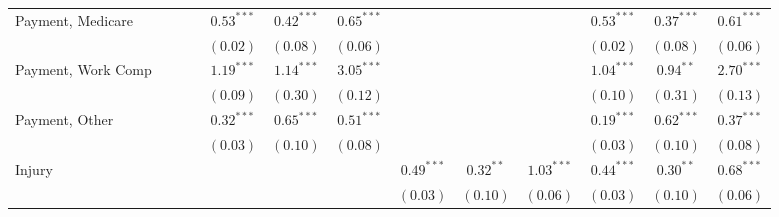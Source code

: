 \documentclass[12pt,twoside]{reedthesis}
\begin{document}
\begin{table}
\begin{center}
\begin{tiny}
\begin{tabular}{l@{} c@{} c@{} c@{} c@{} c@{} c@{} c@{} c@{} c@{} c@{} c@{} c@{} }
  Payment, Medicare  &                       &                        &                        & $\mathbf{0.53}^{***}$  & $\mathbf{0.42}^{***}$  & $\mathbf{0.65}^{***}$  &                        &                        &                        & $\mathbf{0.53}^{***}$  & $\mathbf{0.37}^{***}$  & $\mathbf{0.61}^{***}$  \\
                     &                       &                        &                        & $(0.02)$               & $(0.08)$               & $(0.06)$               &                        &                        &                        & $(0.02)$               & $(0.08)$               & $(0.06)$               \\
  Payment, Work Comp &                       &                        &                        & $\mathbf{1.19}^{***}$  & $\mathbf{1.14}^{***}$  & $\mathbf{3.05}^{***}$  &                        &                        &                        & $\mathbf{1.04}^{***}$  & $\mathbf{0.94}^{**}$   & $\mathbf{2.70}^{***}$  \\
                     &                       &                        &                        & $(0.09)$               & $(0.30)$               & $(0.12)$               &                        &                        &                        & $(0.10)$               & $(0.31)$               & $(0.13)$               \\
  Payment, Other     &                       &                        &                        & $\mathbf{0.32}^{***}$  & $\mathbf{0.65}^{***}$  & $\mathbf{0.51}^{***}$  &                        &                        &                        & $\mathbf{0.19}^{***}$  & $\mathbf{0.62}^{***}$  & $\mathbf{0.37}^{***}$  \\
                     &                       &                        &                        & $(0.03)$               & $(0.10)$               & $(0.08)$               &                        &                        &                        & $(0.03)$               & $(0.10)$               & $(0.08)$               \\
  Injury             &                       &                        &                        &                        &                        &                        & $\mathbf{0.49}^{***}$  & $\mathbf{0.32}^{**}$   & $\mathbf{1.03}^{***}$  & $\mathbf{0.44}^{***}$  & $\mathbf{0.30}^{**}$   & $\mathbf{0.68}^{***}$  \\
                     &                       &                        &                        &                        &                        &                        & $(0.03)$               & $(0.10)$               & $(0.06)$               & $(0.03)$               & $(0.10)$               & $(0.06)$               \\

\end{tabular}
\end{tiny}
\end{center}
\end{table}
\end{document}
